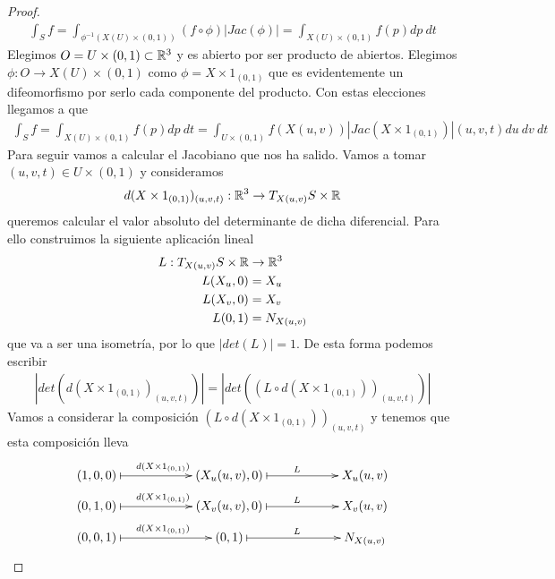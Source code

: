 \begin{prop}
\begin{proof}
\begin{gather*}
            \int_S f = \int_{\phi^{-1}(X(U)\times (0,1))} (f\circ \phi) |Jac(\phi)| = \int_{X(U)\times(0,1)} f(p)dp\ dt
        \end{gather*}
        Elegimos $O = U\times (0,1)\subset \mathbb{R}^3$ y es abierto por ser producto de abiertos. Elegimos $\phi: O \to X(U)\times (0,1)$ como $\phi = X \times 1_{(0,1)}$ que es evidentemente un difeomorfismo por serlo cada componente del producto. Con estas elecciones llegamos a que  
        \begin{gather*}
            \int_S f = \int_{X(U)\times (0,1)} f(p) dp\ dt  = \int_{U\times(0,1)} f(X(u,v)) |Jac(X\times 1_{(0,1)})|(u,v,t) du\ dv\ dt
        \end{gather*}
        Para seguir vamos a calcular el Jacobiano que nos ha salido. Vamos a tomar $(u,v,t)\in U\times (0,1)$ y consideramos
        \begin{gather*}
            d(X\times 1_{(0,1)})_{(u,v,t)} : \mathbb{R}^3 \to T_{X(u,v)}S\times \mathbb{R}
        \end{gather*}
        queremos calcular el valor absoluto del determinante de dicha diferencial. Para ello construimos la siguiente aplicación lineal 
        \begin{align*}
            L : T_{X(u,v)}S \times \mathbb{R} &\to \mathbb{R}^3\\
            L(X_u, 0) &= X_u\\
            L(X_v, 0) &= X_v\\
            L(0, 1) &= N_{X(u,v)}
        \end{align*}
        que va a ser una isometría, por lo que $|det(L)| = 1$. De esta forma podemos escribir      
        \begin{gather*}
            |det(d(X\times 1_{(0,1)})_{(u,v,t)})| = |det( (L \circ d(X\times 1_{(0,1)}))_{(u,v,t)})|
        \end{gather*}
        Vamos a considerar la composición $(L \circ d(X\times 1_{(0,1)}))_{(u,v,t)}$ y tenemos que esta composición lleva
        \begin{gather*}
            \xymatrix@C=2cm@R=3mm{
                (1,0,0) \ar@{|->}[r]^{d(X\times 1_{(0,1)})} & (X_u(u,v), 0) \ar@{|->}[r]^{L} & X_u(u,v)\\
                (0,1,0) \ar@{|->}[r]^{d(X\times 1_{(0,1)})} & (X_v(u,v), 0) \ar@{|->}[r]^{L} & X_v(u,v)\\
                (0,0,1) \ar@{|->}[r]^{d(X\times 1_{(0,1)})} & (0,1) \ar@{|->}[r]^{L} &  N_{X(u,v)}
            }
        \end{gather*}

\end{proof}
\end{prop}
